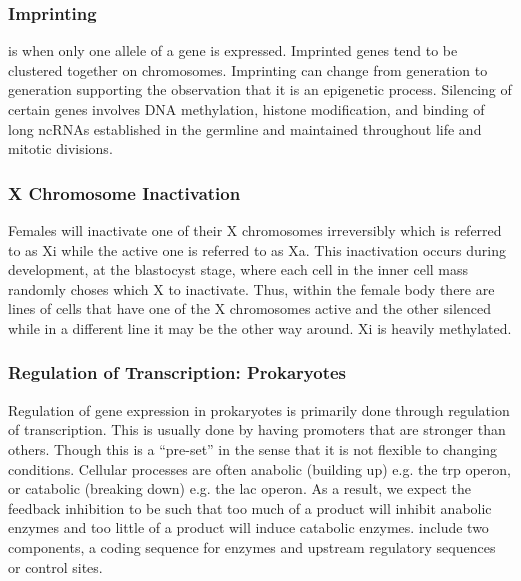 \documentclass[../Bio_chemistryReview.tex]{subfiles}
\begin{document}
\subsubsection{Imprinting}
 is when only one allele of a gene is expressed.
Imprinted genes tend to be clustered together on chromosomes. Imprinting can
change from generation to generation supporting the observation that it is an
epigenetic process. Silencing of certain genes involves DNA methylation, histone
modification, and binding of long ncRNAs established in the germline and
maintained throughout life and mitotic divisions.

\subsubsection{X Chromosome Inactivation}
Females will inactivate one of their X chromosomes irreversibly which is
referred to as Xi while the active one is referred to as Xa. This inactivation
occurs during development, at the blastocyst stage, where each cell in the inner
cell mass randomly choses which X to inactivate. Thus, within the female body
there are lines of cells that have one of the X chromosomes active and the other
silenced while in a different line it may be the other way around. Xi is heavily
methylated.

\subsubsection{Regulation of Transcription: Prokaryotes}
Regulation of gene expression in prokaryotes is primarily done through
regulation of transcription. This is usually done by having promoters that are
stronger than others. Though this is a ``pre-set'' in the sense that it is not
flexible to changing conditions. Cellular processes are often anabolic
(building up) e.g. the trp operon, or catabolic (breaking down) e.g. the lac
operon. As a result, we expect the feedback inhibition to be such that too much
of a product will inhibit anabolic enzymes and too little of a product will
induce catabolic enzymes.  include two components, a coding
sequence for enzymes and upstream regulatory sequences or control sites.
\end{document}
